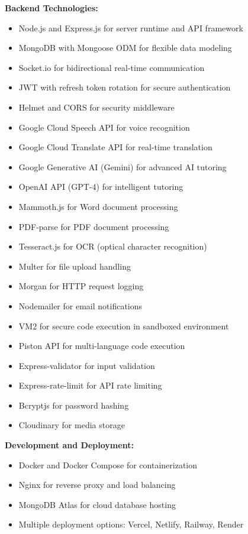 \documentclass[onecolumn]{IEEEtran}
\begin{document}
\textbf{Backend Technologies:}
\begin{itemize}
\item Node.js and Express.js for server runtime and API framework
\item MongoDB with Mongoose ODM for flexible data modeling
\item Socket.io for bidirectional real-time communication
\item JWT with refresh token rotation for secure authentication
\item Helmet and CORS for security middleware
\item Google Cloud Speech API for voice recognition
\item Google Cloud Translate API for real-time translation
\item Google Generative AI (Gemini) for advanced AI tutoring
\item OpenAI API (GPT-4) for intelligent tutoring
\item Mammoth.js for Word document processing
\item PDF-parse for PDF document processing
\item Tesseract.js for OCR (optical character recognition)
\item Multer for file upload handling
\item Morgan for HTTP request logging
\item Nodemailer for email notifications
\item VM2 for secure code execution in sandboxed environment
\item Piston API for multi-language code execution
\item Express-validator for input validation
\item Express-rate-limit for API rate limiting
\item Bcryptjs for password hashing
\item Cloudinary for media storage
\end{itemize}

\textbf{Development and Deployment:}
\begin{itemize}
\item Docker and Docker Compose for containerization \cite{docker2024}
\item Nginx for reverse proxy and load balancing
\item MongoDB Atlas for cloud database hosting \cite{mongodb2024}
\item Multiple deployment options: Vercel, Netlify, Railway, Render
\end{itemize}
\end{document}
